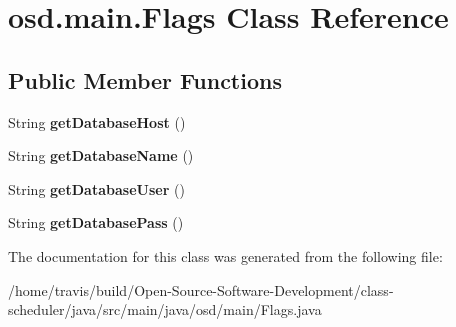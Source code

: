 \hypertarget{classosd_1_1main_1_1_flags}{\section{osd.\-main.\-Flags Class Reference}
\label{classosd_1_1main_1_1_flags}
}
\subsection*{Public Member Functions}
\begin{DoxyCompactItemize}
\item 
\hypertarget{classosd_1_1main_1_1_flags_a517087945781310a1267c2da33ef0c31}{String {\bfseries get\-Database\-Host} ()}\label{classosd_1_1main_1_1_flags_a517087945781310a1267c2da33ef0c31}

\item 
\hypertarget{classosd_1_1main_1_1_flags_ac19cf26540770eb693fc6dc2b01162cb}{String {\bfseries get\-Database\-Name} ()}\label{classosd_1_1main_1_1_flags_ac19cf26540770eb693fc6dc2b01162cb}

\item 
\hypertarget{classosd_1_1main_1_1_flags_a97f2cbb968226db020be728142e1adb0}{String {\bfseries get\-Database\-User} ()}\label{classosd_1_1main_1_1_flags_a97f2cbb968226db020be728142e1adb0}

\item 
\hypertarget{classosd_1_1main_1_1_flags_a699ec59399c7291817422381a54f116b}{String {\bfseries get\-Database\-Pass} ()}\label{classosd_1_1main_1_1_flags_a699ec59399c7291817422381a54f116b}

\end{DoxyCompactItemize}


The documentation for this class was generated from the following file\-:\begin{DoxyCompactItemize}
\item 
/home/travis/build/\-Open-\/\-Source-\/\-Software-\/\-Development/class-\/scheduler/java/src/main/java/osd/main/Flags.\-java\end{DoxyCompactItemize}
